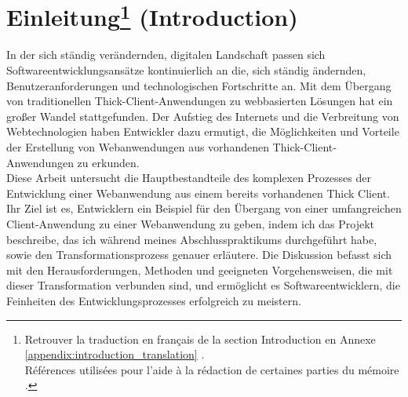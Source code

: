 \documentclass[a4paper, 12pt, french]{article}
\begin{document}
	\newpage
	
	\setcounter{page}{12}
	\renewcommand\thepage{\arabic{page}}
	\rfoot{Page \thepage}
	
	\listoffigures
	

	\listoftables
	\newpage

	\printglossary

	\newpage
	

	\part*{Einleitung\footnote{Retrouver la traduction en français de la section Introduction en Annexe \ref{appendix:introduction_translation} .\\ Références utilisées pour l'aide à la rédaction de certaines parties du mémoire \cite{scribbr:remerciements}\space\cite{scribbr:introduction}\space\cite{scribbr:plan}\space\cite{scribbr:cadre_theorique}.} (Introduction)}
		In der sich ständig verändernden, digitalen Landschaft passen sich Softwareentwicklungsansätze kontinuierlich an die, sich ständig ändernden, Benutzeranforderungen und technologischen Fortschritte an. Mit dem  Übergang von traditionellen Thick-Client-Anwendungen zu webbasierten Lösungen hat ein großer Wandel stattgefunden. Der Aufstieg des Internets und die Verbreitung von Webtechnologien haben Entwickler dazu ermutigt, die Möglichkeiten und Vorteile der Erstellung von Webanwendungen aus vorhandenen Thick-Client-Anwendungen zu erkunden.\\

		Diese Arbeit untersucht die Hauptbestandteile des komplexen Prozesses der Entwicklung einer Webanwendung aus einem bereits vorhandenen Thick Client. Ihr Ziel ist es, Entwicklern ein Beispiel für den Übergang von einer umfangreichen Client-Anwendung zu einer Webanwendung zu geben, indem ich das Projekt beschreibe, das ich während meines Abschlusspraktikums durchgeführt habe, sowie den Transformationsprozess genauer erläutere. Die Diskussion befasst sich mit den Herausforderungen, Methoden und geeigneten Vorgehensweisen, die mit dieser Transformation verbunden sind, und ermöglicht es Softwareentwicklern, die Feinheiten des Entwicklungsprozesses erfolgreich zu meistern.\\
\end{document}
